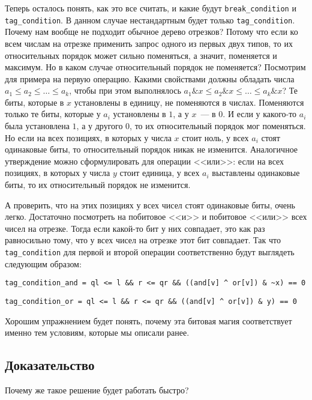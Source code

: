 Теперь осталось понять, как это все считать, и какие будут \verb+break_condition+ и \verb+tag_condition+. В данном случае нестандартным будет только \verb+tag_condition+. Почему нам вообще не подходит обычное дерево отрезков? Потому что если ко всем числам на отрезке применить запрос одного из первых двух типов, то их относительных порядок может сильно поменяться, а значит, поменяется и максимум. Но в каком случае относительный порядок не поменяется? Посмотрим для примера на первую операцию. Какими свойствами должны обладать числа $a_1 \le a_2 \le \ldots \le a_k$, чтобы при этом выполнялось $a_1 \& x \le a_2 \& x \le \ldots \le a_k \& x$? Те биты, которые в $x$ установлены в единицу, не поменяются в числах. Поменяются только те биты, которые у $a_i$ установлены в $1$, а у $x$~--- в $0$. И если у какого-то $a_i$ была установлена $1$, а у другого $0$, то их относительный порядок мог поменяться. Но если на всех позициях, в которых у числа $x$ стоит ноль, у всех $a_i$ стоят одинаковые биты, то относительный порядок никак не изменится. Аналогичное утверждение можно сформулировать для операции <<или>>: если на всех позициях, в которых у числа $y$ стоит единица, у всех $a_i$ выставлены одинаковые биты, то их относительный порядок не изменится.

А проверить, что на этих позициях у всех чисел стоят одинаковые биты, очень легко. Достаточно посмотреть на побитовое <<и>> и побитовое <<или>> всех чисел на отрезке. Тогда если какой-то бит у них совпадает, это как раз равносильно тому, что у всех чисел на отрезке этот бит совпадает. Так что \verb+tag_condition+ для первой и второй операции соответственно будут выглядеть следующим образом:

\verb+tag_condition_and = ql <= l && r <= qr && ((and[v] ^ or[v]) & ~x) == 0+

\verb+tag_condition_or = ql <= l && r <= qr && ((and[v] ^ or[v]) & y) == 0+

\begin{exercise}
    Хорошим упражнением будет понять, почему эта битовая магия соответствует именно тем условиям, которые мы описали ранее.
\end{exercise}



\subsection{Доказательство}

Почему же такое решение будет работать быстро?

